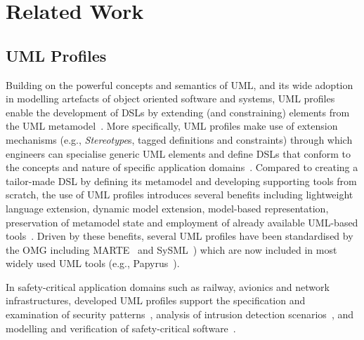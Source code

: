 \section{Related Work} 
\label{sec:related}

\subsection{UML Profiles}
Building on the powerful concepts and semantics of UML, and its wide adoption in modelling artefacts of object oriented software and systems, UML profiles enable the development of DSLs by extending (and constraining) elements from the UML metamodel~\cite{FuentesFernandez2004:UMLME}. 
More specifically, UML profiles make use of extension mechanisms (e.g., \textit{Stereotype}s, tagged definitions and constraints) through which engineers can 
specialise generic UML elements and define DSLs that conform to the concepts and nature of specific application domains~\cite{Selic2007:ISORC}. 
Compared to creating a tailor-made DSL by defining its metamodel and developing supporting tools from scratch, the use of UML profiles introduces several benefits including lightweight language extension, dynamic model extension, model-based representation, preservation of metamodel state and employment of already available UML-based tools~\cite{langer2011uml}. 
Driven by these benefits, several UML profiles have been standardised by the OMG including MARTE~\cite{omg2011marte} and SySML~\cite{friedenthal2014practical}) which are now included in most widely used UML tools (e.g., Papyrus~\cite{lanusse2009papyrus}). 

In safety-critical application domains such as railway, avionics and network infrastructures, developed UML profiles support the specification and examination of security patterns~\cite{Bouaziz2012:ICCSE,Rodriguez2010:SERENE}, analysis of intrusion detection scenarios~\cite{hussein2006umlintr}, and modelling and verification of safety-critical software~\cite{Bernardi2013:JRESS, zoughbi2007uml, wei2019model}.


